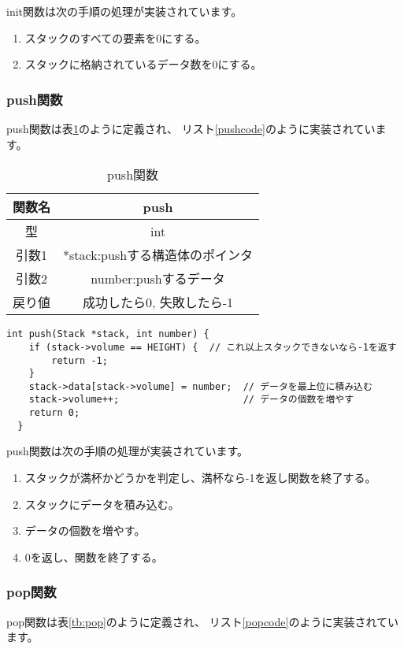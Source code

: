 \documentclass[a4j]{jarticle}
\begin{document}
init関数は次の手順の処理が実装されています。
\begin{enumerate}
  \item スタックのすべての要素を0にする。
  \item スタックに格納されているデータ数を0にする。
\end{enumerate}

\subsubsection{push関数}
push関数は表\ref{tb:push}のように定義され、
リスト\ref{pushcode}のように実装されています。

\begin{table}[h]
  \centering
  \caption{push関数}
  \label{tb:push}
  \begin{tabular}{|c|c|}
    \hline
    関数名 & push                  \\
    \hline
    型   & int                   \\
    \hline
    引数1 & *stack:pushする構造体のポインタ \\
    \hline
    引数2 & number:pushするデータ      \\
    \hline
    戻り値 & 成功したら0, 失敗したら-1       \\
    \hline
  \end{tabular}
\end{table}

\begin{lstlisting}[caption=push関数,label=pushcode]
  int push(Stack *stack, int number) {
    if (stack->volume == HEIGHT) {  // これ以上スタックできないなら-1を返す
        return -1;
    }
    stack->data[stack->volume] = number;  // データを最上位に積み込む
    stack->volume++;                      // データの個数を増やす
    return 0;
  }
  \end{lstlisting}

push関数は次の手順の処理が実装されています。
\begin{enumerate}
  \item スタックが満杯かどうかを判定し、満杯なら-1を返し関数を終了する。
  \item スタックにデータを積み込む。
  \item データの個数を増やす。
  \item 0を返し、関数を終了する。
\end{enumerate}

\subsubsection{pop関数}
pop関数は表\ref{tb:pop}のように定義され、
リスト\ref{popcode}のように実装されています。
\end{document}
